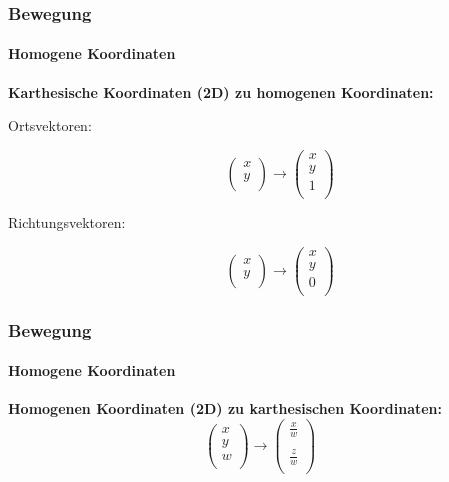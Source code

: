 \documentclass[dvips,12pt,xcolor=table]{beamer}
\begin{document}
\begin{frame}
\frametitle{Bewegung}
\framesubtitle{Homogene Koordinaten}
\textbf{Karthesische Koordinaten (2D) zu homogenen Koordinaten:}
\begin{description}
 \item[Ortsvektoren:]
  \begin{equation}
   \left(\begin{array}{c}
    x \\
    y \\
   \end{array}\right)
   \rightarrow
   \left(\begin{array}{c}
    x \\
    y \\
    1 \\
   \end{array}\right)
  \end{equation}

 \item[Richtungsvektoren:]
  \begin{equation}
   \left(\begin{array}{c}
    x \\
    y \\
   \end{array}\right)
   \rightarrow
   \left(\begin{array}{c}
    x \\
    y \\
    0 \\
   \end{array}\right)
  \end{equation}
\end{description}
\end{frame}

\begin{frame}
\frametitle{Bewegung}
\framesubtitle{Homogene Koordinaten}
\textbf{Homogenen Koordinaten (2D) zu karthesischen Koordinaten: \\}
\begin{equation}
 \left(\begin{array}{c}
  x \\
  y \\
  w \\
 \end{array}\right)
 \rightarrow
 \left(\begin{array}{c}
  \frac{x}{w} \\
  \\
  \frac{z}{w} \\
 \end{array}\right)
\end{equation}
\end{frame}
\end{document}
